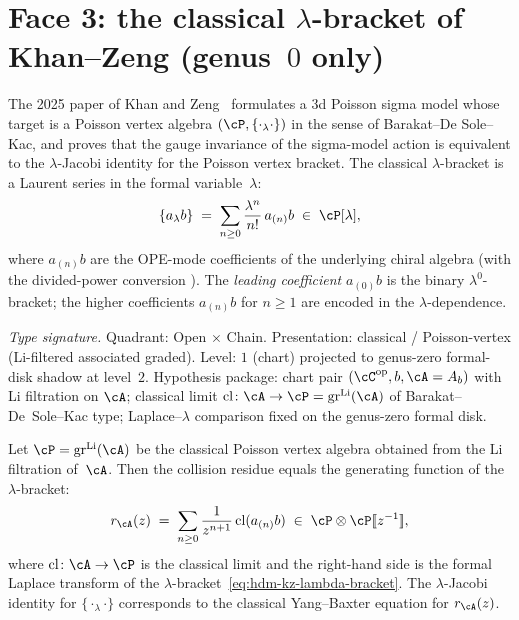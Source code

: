 \section{Face 3: the classical $\lambda$-bracket of Khan--Zeng \textup{(}genus~$0$ only\textup{)}}
\label{sec:hdm-face-3}

The 2025 paper of Khan and Zeng~\cite{KhanZeng25} formulates a
3d Poisson sigma model whose target is a Poisson vertex algebra
$(\cP, \{\cdot_\lambda\cdot\})$ in the sense of Barakat--De Sole--Kac,
and proves that the gauge invariance of the sigma-model action is
equivalent to the $\lambda$-Jacobi identity for the Poisson vertex
bracket. The classical $\lambda$-bracket is a Laurent series in the
formal variable~$\lambda$:
\begin{equation}\label{eq:hdm-kz-lambda-bracket}
\{a_\lambda b\}
\;=\;
\sum_{n \geq 0} \frac{\lambda^n}{n!}\, a_{(n)}b
\;\in\;
\cP[\lambda],
\end{equation}
where $a_{(n)}b$ are the OPE-mode coefficients of the underlying
chiral algebra (with the divided-power conversion ). The
\emph{leading coefficient} $a_{(0)}b$ is the binary $\lambda^0$-bracket;
the higher coefficients $a_{(n)}b$ for $n \geq 1$ are encoded in the
$\lambda$-dependence.

\begin{theorem}
\label{thm:hdm-face-3}
\emph{Type signature.} Quadrant: Open $\times$ Chain. Presentation:
classical / Poisson-vertex (Li-filtered associated graded). Level:
$1$ (chart) projected to genus-zero formal-disk shadow at level~$2$.
Hypothesis package: chart pair $(\cC^{\mathrm{op}}, b, \cA = A_b)$
with Li filtration on $\cA$; classical limit
$\mathrm{cl}\colon\cA\to\cP=\mathrm{gr}^{\mathrm{Li}}(\cA)$
of Barakat--De~Sole--Kac type; Laplace--$\lambda$ comparison fixed
on the genus-zero formal disk.

Let $\cP = \mathrm{gr}^{\mathrm{Li}}(\cA)$ be the classical Poisson
vertex algebra obtained from the Li filtration of~$\cA$. Then the
collision residue equals the generating function of the
$\lambda$-bracket:
\begin{equation}\label{eq:hdm-face-3}
r_\cA(z)
\;=\;
\sum_{n \geq 0} \frac{1}{z^{n+1}}\, \mathrm{cl}(a_{(n)}b)
\;\in\;
\cP \otimes \cP [\![z^{-1}]\!],
\end{equation}
where $\mathrm{cl}\colon \cA \to \cP$ is the classical limit and
the right-hand side is the formal Laplace transform of the
$\lambda$-bracket~\eqref{eq:hdm-kz-lambda-bracket}. The
$\lambda$-Jacobi identity for $\{\cdot_\lambda\cdot\}$ corresponds
to the classical Yang--Baxter equation for $r_\cA(z)$.
\end{theorem}

